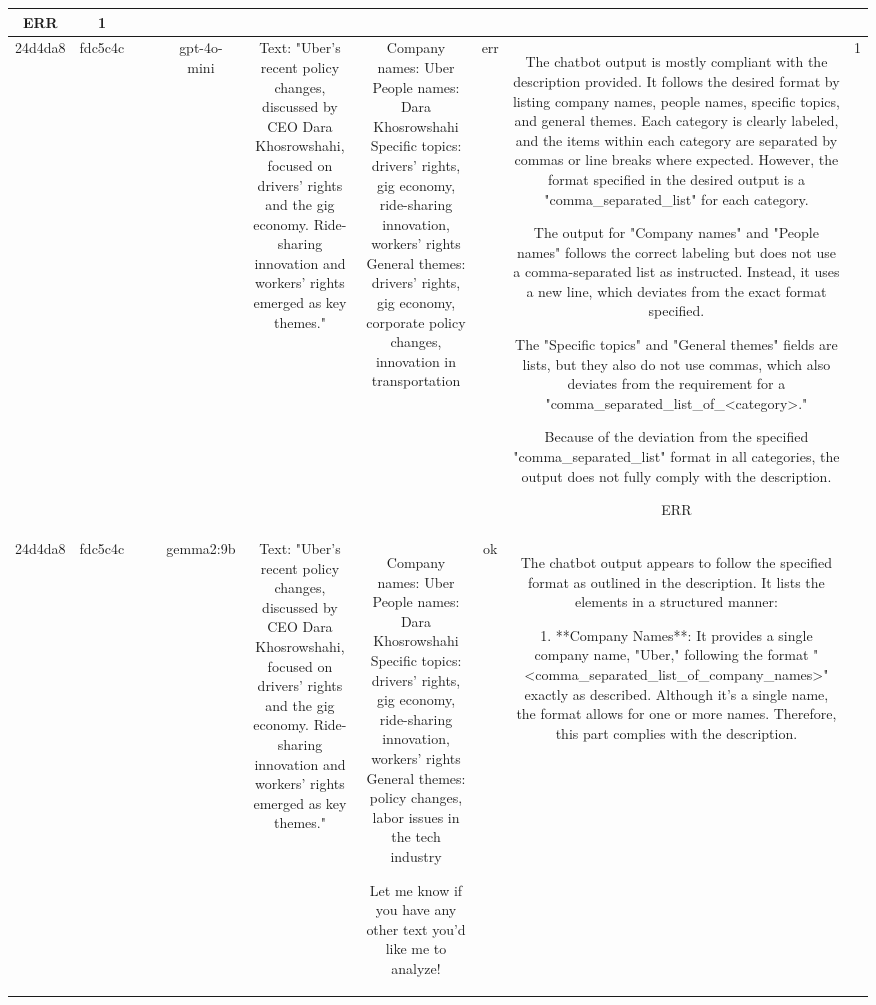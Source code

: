 \begin{table}[h!]
\begin{tabular}{|c|c|c|c|c|c|c|c|c|c|}
ERR & 1\\
\hline
24d4da8 & fdc5c4c &  &  & gpt-4o-mini & Text: "Uber's recent policy changes, discussed by CEO Dara Khosrowshahi, focused on drivers' rights and the gig economy. Ride-sharing innovation and workers' rights emerged as key themes." & Company names: Uber  
People names: Dara Khosrowshahi  
Specific topics: drivers' rights, gig economy, ride-sharing innovation, workers' rights  
General themes: drivers' rights, gig economy, corporate policy changes, innovation in transportation & err & The chatbot output is mostly compliant with the description provided. It follows the desired format by listing company names, people names, specific topics, and general themes. Each category is clearly labeled, and the items within each category are separated by commas or line breaks where expected. However, the format specified in the desired output is a "comma_separated_list" for each category.

The output for "Company names" and "People names" follows the correct labeling but does not use a comma-separated list as instructed. Instead, it uses a new line, which deviates from the exact format specified.

The "Specific topics" and "General themes" fields are lists, but they also do not use commas, which also deviates from the requirement for a "comma_separated_list_of_<category>."

Because of the deviation from the specified "comma_separated_list" format in all categories, the output does not fully comply with the description.

ERR & 1\\
\hline
24d4da8 & fdc5c4c &  &  & gemma2:9b & Text: "Uber's recent policy changes, discussed by CEO Dara Khosrowshahi, focused on drivers' rights and the gig economy. Ride-sharing innovation and workers' rights emerged as key themes." & Company names: Uber 
People names: Dara Khosrowshahi
Specific topics: drivers' rights, gig economy, ride-sharing innovation, workers' rights
General themes:  policy changes, labor issues in the tech industry 


Let me know if you have any other text you'd like me to analyze! & ok & The chatbot output appears to follow the specified format as outlined in the description. It lists the elements in a structured manner: 

1. **Company Names**: It provides a single company name, "Uber," following the format "<comma_separated_list_of_company_names>" exactly as described. Although it's a single name, the format allows for one or more names. Therefore, this part complies with the description.


\end{tabular}
\end{table}
